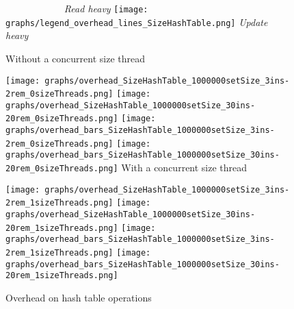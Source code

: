 \documentclass{article}
\begin{document}
\begin{figure*}[b]
  \caption{Overhead on hash table operations}
  \centering
  \medskip
  \textit{\ \ \ \ \ \ \ \ \ \ \ \ Read heavy}\hfill
  \texttt{[image: graphs/legend\_overhead\_lines\_SizeHashTable.png]}\hfill
  \textit{Update heavy\ \ \ \ }\par
  \medskip
  Without a concurrent size thread\par
  \hspace*{1.8mm}\texttt{[image: graphs/overhead\_SizeHashTable\_1000000setSize\_3ins-2rem\_0sizeThreads.png]}\hspace*{3.2mm}
  \texttt{[image: graphs/overhead\_SizeHashTable\_1000000setSize\_30ins-20rem\_0sizeThreads.png]}
  \texttt{[image: graphs/overhead\_bars\_SizeHashTable\_1000000setSize\_3ins-2rem\_0sizeThreads.png]}\hspace*{0.001mm}
  \texttt{[image: graphs/overhead\_bars\_SizeHashTable\_1000000setSize\_30ins-20rem\_0sizeThreads.png]}
  \medskip
  With a concurrent size thread\par
  \hspace*{1.8mm}\texttt{[image: graphs/overhead\_SizeHashTable\_1000000setSize\_3ins-2rem\_1sizeThreads.png]}\hspace*{3.2mm}
  \texttt{[image: graphs/overhead\_SizeHashTable\_1000000setSize\_30ins-20rem\_1sizeThreads.png]}
  {\texttt{[image: graphs/overhead\_bars\_SizeHashTable\_1000000setSize\_3ins-2rem\_1sizeThreads.png]}}\hspace*{0.01mm}
  \texttt{[image: graphs/overhead\_bars\_SizeHashTable\_1000000setSize\_30ins-20rem\_1sizeThreads.png]}
  \label{fig:HT overhead}
\end{figure*}
\end{document}
